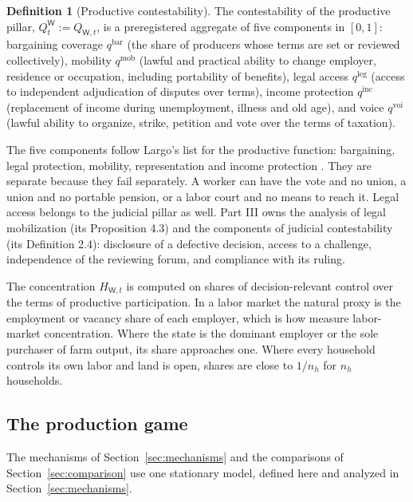 \documentclass[11pt,letterpaper]{article}
\theoremstyle{definition}
\newtheorem{definition}[theorem]{Definition}
\theoremstyle{remark}
\newcommand{\pW}{\mathsf{W}}
\newcommand{\QW}{Q^{\pW}}
\begin{document}
\begin{definition}[Productive contestability]
\label{def:productive-power:qw}
The contestability of the productive pillar, $\QW_t:=Q_{\pW,t}$, is a preregistered aggregate of five components in $[0,1]$: bargaining coverage $q^{\mathrm{bar}}$ (the share of producers whose terms are set or reviewed collectively), mobility $q^{\mathrm{mob}}$ (lawful and practical ability to change employer, residence or occupation, including portability of benefits), legal access $q^{\mathrm{leg}}$ (access to independent adjudication of disputes over terms), income protection $q^{\mathrm{inc}}$ (replacement of income during unemployment, illness and old age), and voice $q^{\mathrm{voi}}$ (lawful ability to organize, strike, petition and vote over the terms of taxation).
\end{definition}

The five components follow Largo's list for the productive function: bargaining, legal protection, mobility, representation and income protection \citep{largo2026hbs}. They are separate because they fail separately. A worker can have the vote and no union, a union and no portable pension, or a labor court and no means to reach it. Legal access belongs to the judicial pillar as well. Part III \citep{long2026judicial} owns the analysis of legal mobilization (its Proposition 4.3) and the components of judicial contestability (its Definition 2.4): disclosure of a defective decision, access to a challenge, independence of the reviewing forum, and compliance with its ruling.

The concentration $H_{\pW,t}$ is computed on shares of decision-relevant control over the terms of productive participation. In a labor market the natural proxy is the employment or vacancy share of each employer, which is how \citet{azar2022} measure labor-market concentration. Where the state is the dominant employer or the sole purchaser of farm output, its share approaches one. Where every household controls its own labor and land is open, shares are close to $1/n_h$ for $n_h$ households.

\subsection{The production game}

The mechanisms of Section~\ref{sec:mechanisms} and the comparisons of Section~\ref{sec:comparison} use one stationary model, defined here and analyzed in Section~\ref{sec:mechanisms}.
\end{document}
